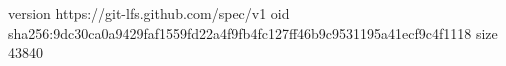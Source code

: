 version https://git-lfs.github.com/spec/v1
oid sha256:9dc30ca0a9429faf1559fd22a4f9fb4fc127ff46b9c9531195a41ecf9c4f1118
size 43840
